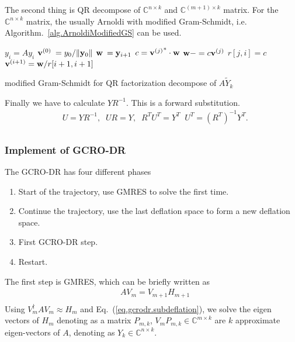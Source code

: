 The second thing is QR decompose of $\mathbb{C}^{n\times k}$ and $\mathbb{C}^{(m+1)\times k}$ matrix. For the $\mathbb{C}^{n\times k}$ matrix, the usually Arnoldi with modified Gram-Schmidt, i.e. Algorithm.~\ref{alg.ArnoldiModifiedGS} can be used.
\begin{algorithm}[H]
\begin{algorithmic}
    \State $y_i=Ay_i$
\EndFor
\State ${\bf v}^{(0)}\:=y_0/\|{\bf y}_0\|$
    \State ${\bf w}\:={\bf y}_{i+1}$
        \State $c={{\bf v}^{(j)}}^*\cdot {\bf w}$
        \State ${\bf w}-=c{\bf v}^{(j)}$
        \State $r[j,i]=c$
    \EndFor
    \State ${\bf v}^{(i+1)}={\bf w}/r[i+1,i+1]$
\EndFor

\end{algorithmic}
\caption{modified Gram-Schmidt for QR factorization decompose of $A\tilde{Y}_k$}
\end{algorithm}

Finally we have to calculate $YR^{-1}$. This is a forward substitution.
\begin{equation}
\begin{split}
&U=YR^{-1},\;\; UR=Y,\;\;R^{T}U^{T}=Y^T\;\;U^{T}=\left(R^{T}\right)^{-1}Y^T.\\
\end{split}
\end{equation}

\subsubsection{\label{sec:impgcrodr}Implement of GCRO-DR}

The GCRO-DR has four different phases
\begin{enumerate}
  \item Start of the trajectory, use GMRES to solve the first time.
  \item Continue the trajectory, use the last deflation space to form a new deflation space.
  \item First GCRO-DR step.
  \item Restart.
\end{enumerate}

The first step is GMRES, which can be briefly written as
\begin{equation}
\begin{split}
&AV_m=V_{m+1}H_{m+1}\\
\end{split}
\end{equation}
Using $V_{m}^{\dagger}AV_m\approx H_m$ and Eq.~(\ref{eq.gcrodr.subdeflation}), we solve the eigen vectors of $H_m$ denoting as a matrix $P_{m,k}$, $V_mP_{m,k}\in \mathbb{C}^{m\times k}$ are $k$ approximate eigen-vectors of $A$, denoting as $Y_k\in \mathbb{C}^{n\times k}$.

